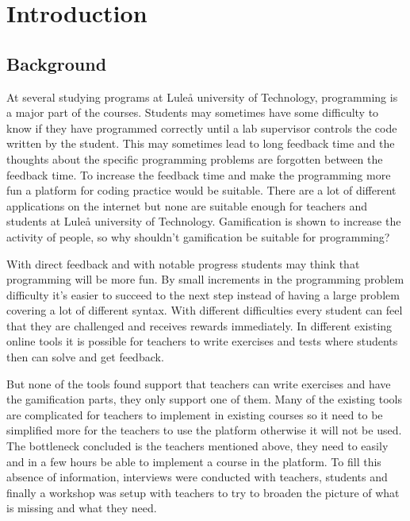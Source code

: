 \section{Introduction}
\subsection{Background} 
At several studying programs at Luleå university of Technology, programming is a major part of the courses. Students may sometimes have some difficulty to know if they have programmed correctly until a lab supervisor controls the code written by the student. This may sometimes lead to long feedback time and the thoughts about the specific programming problems are forgotten between the feedback time. To increase the feedback time and make the programming more fun a platform for coding practice would be suitable. There are a lot of different applications on the internet but none are suitable enough for teachers and students at Luleå university of Technology. Gamification is shown to increase the activity of people, so why shouldn't gamification be suitable for programming? 

With direct feedback and with notable progress students may think that programming will be more fun. By small increments in the programming problem difficulty it's easier to succeed to the next step instead of having a large problem covering a lot of different syntax. With different difficulties every student can feel that they are challenged and receives rewards immediately. In different existing online tools it is possible for teachers to write exercises and tests where students then can solve and get feedback. 

But none of the tools found support that teachers can write exercises and have the gamification parts, they only support one of them. Many of the existing tools are complicated for teachers to implement in existing courses so it need to be simplified more for the teachers to use the platform otherwise it will not be used. The bottleneck concluded is the teachers mentioned above, they need to easily and in a few hours be able to implement a course in the platform. To fill this absence of information, interviews were conducted with teachers, students and finally a workshop was setup with teachers to try to broaden the picture of what is missing and what they need.


